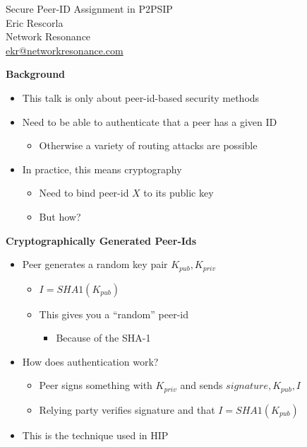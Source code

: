 \documentclass[helvetica]{seminar}
\newcommand{\heading}[1]{%
  \begin{center} 
    \large\bf 
    #1 
  \end{center} 
  \vspace{.4 in}}
\begin{document}
\begin{slide}
\begin{center}
\LARGE{{\bf}Secure Peer-ID Assignment in P2PSIP}\\

\vspace{.6 in}
\large{Eric Rescorla}\\
\large{Network Resonance}\\
\large{\url{ekr@networkresonance.com}}

\end{center}
\end{slide}



\begin{slide}
\heading{Background}

\begin{itemize}
\item This talk is only about peer-id-based security methods
\item Need to be able to authenticate that a peer has a given ID
\begin{itemize}
\item Otherwise a variety of routing attacks are possible
\end{itemize}
\item In practice, this means cryptography
\begin{itemize}
\item Need to bind peer-id $X$ to its public key
\item But how?
\end{itemize}
\end{itemize}
\end{slide}


\begin{slide}
\heading{Cryptographically Generated Peer-Ids}

\begin{itemize}
\item Peer generates a random key pair $K_{pub}, K_{priv}$
\begin{itemize}
\item $I = SHA1(K_{pub})$
\item This gives you a ``random'' peer-id
\begin{itemize}
\item Because of the SHA-1
\end{itemize}
\end{itemize}
\item How does authentication work?
\begin{itemize}
\item Peer signs something with $K_{priv}$ and sends $signature, K_{pub}, I$
\item Relying party verifies signature and that  $I = SHA1(K_{pub})$
\end{itemize}
\item This is the technique used in HIP
\end{itemize}
\end{slide}
\end{document}
